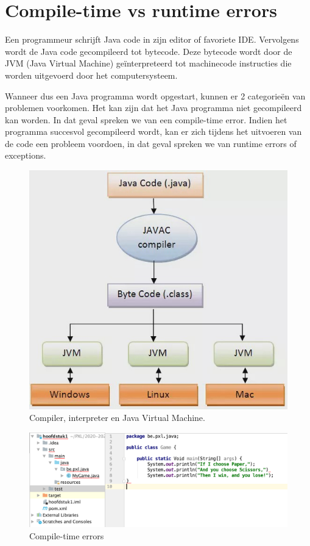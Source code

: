 \documentclass{tstextbook}
\begin{document}
\section{Compile-time vs runtime errors}

Een programmeur schrijft Java code in zijn editor of favoriete IDE. Vervolgens wordt de Java code gecompileerd tot bytecode. Deze bytecode wordt door de JVM (Java Virtual Machine) ge\"interpreteerd tot machinecode instructies die worden uitgevoerd door het computersysteem.

Wanneer dus een Java programma wordt opgestart, kunnen er 2 categorie\"en van problemen voorkomen. Het kan zijn dat het Java programma niet gecompileerd kan worden. In dat geval spreken we van een compile-time error. Indien het programma succesvol gecompileerd wordt, kan er zich tijdens het uitvoeren van de code een probleem voordoen, in dat geval spreken we van runtime errors of exceptions. 

\begin{figure}[H]
  \includegraphics[width=\linewidth]{images/h1/java_compiler.jpeg}
  \caption{Compiler, interpreter en Java Virtual Machine.}
  \label{fig:compiler}
\end{figure}


\begin{figure}[H]
  \includegraphics[width=\linewidth]{images/h1/compiletime_errors.png}
  \caption{Compile-time errors}
  \label{fig:compiletime_errors}
\end{figure}
\end{document}
